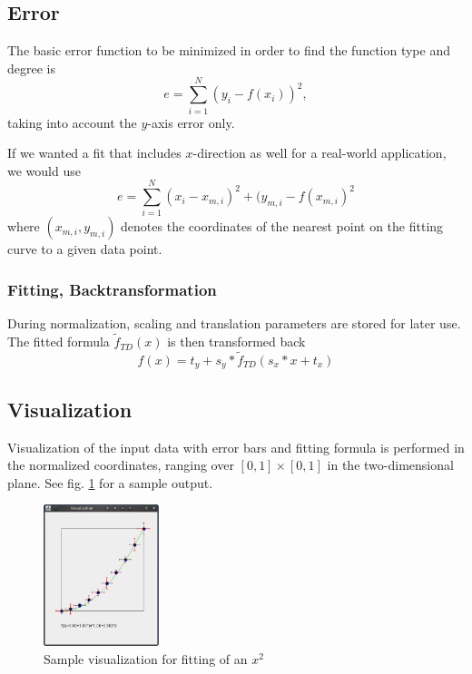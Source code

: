 \documentclass[useAMS,usenatbib]{mn2e}
\begin{document}
\subsection{Error}
The basic error function to be minimized in order to find the function
type and degree is
%
\begin{equation}
  e=\sum_{i=1}^N (y_i-f(x_i))^2,
\end{equation}
%
taking into account the $y$-axis error only.

If we wanted a fit that includes $x$-direction as well for a
real-world application, we would use
%
\begin{equation}
  e=\sum_{i=1}^N (x_i-x_{m,i})^2+(y_{m,i}-f(x_{m,i})^2
\end{equation}
%
where $(x_{m,i},y_{m,i})$ denotes the coordinates of the nearest point
on the fitting curve to a given data point.
%
\subsubsection{Fitting, Backtransformation}
During normalization, scaling and translation parameters are stored
for later use. The fitted formula $\tilde{f}_{TD}(x)$ is then transformed back
%
\begin{equation}
  f(x)=t_y+s_y*\tilde{f}_{TD}(s_x*x+t_x)
\end{equation}
%
%
\subsection{Visualization}
Visualization of the input data with error bars and fitting formula is
performed in the normalized coordinates, ranging over
$[0,1]\times[0,1]$ in the two-dimensional plane. See
fig. \ref{fig:vis} for a sample output.
%
\begin{figure}
  \begin{center}
    \includegraphics[width=0.3\textwidth]{fig/vis.eps}
  \end{center}
  \caption{\label{fig:vis}Sample visualization for fitting of an $x^2$}
\end{figure}
\end{document}
